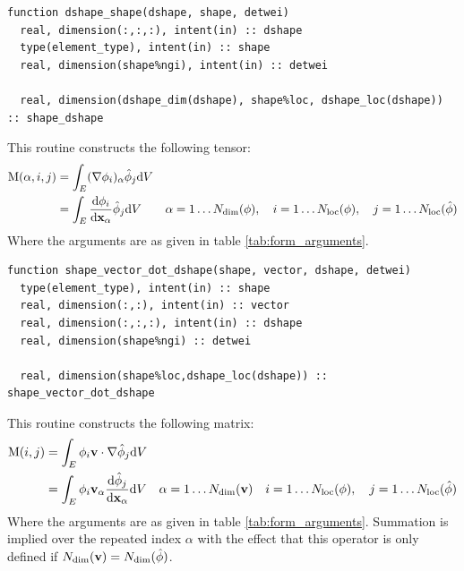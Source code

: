 \documentclass[a4paper, 11pt]{book}
\begin{document}

\begin{lstlisting}
function dshape_shape(dshape, shape, detwei)
  real, dimension(:,:,:), intent(in) :: dshape
  type(element_type), intent(in) :: shape
  real, dimension(shape%ngi), intent(in) :: detwei

  real, dimension(dshape_dim(dshape), shape%loc, dshape_loc(dshape)) :: shape_dshape
\end{lstlisting}
This routine constructs the following tensor:
\begin{equation}
  \begin{split}
    \mathrm{M}(\alpha,i,j)&=\int_E (\nabla{\phi}_i)_\alpha\hat{\phi}_{j}\mathrm{d} V\\
    &=\int_E \frac{\mathrm{d}\phi_i}{\mathrm{d}\mathbf{x}_\alpha}\hat{\phi}_{j}\mathrm{d} V\quad
  \quad \alpha=1\ldots N_\mathrm{dim}(\phi),\quad i=1\ldots N_\mathrm{loc}(\phi),\quad j=1\ldots N_\mathrm{loc}(\hat{\phi})
  \end{split}
\end{equation}
Where the arguments are as given in table \ref{tab:form_arguments}.



\begin{lstlisting}
function shape_vector_dot_dshape(shape, vector, dshape, detwei)
  type(element_type), intent(in) :: shape
  real, dimension(:,:), intent(in) :: vector
  real, dimension(:,:,:), intent(in) :: dshape
  real, dimension(shape%ngi) :: detwei

  real, dimension(shape%loc,dshape_loc(dshape)) :: shape_vector_dot_dshape
\end{lstlisting}

This routine constructs the following matrix:
\begin{equation}
\begin{split} 
  \mathrm{M}(i,j)&=\int_E \phi_{i}\mathbf{v}\cdot\nabla\hat{\phi}_{j}\mathrm{d} V\\
  &=\int_E \phi_{i}\mathbf{v}_\alpha\frac{\mathrm{d}\hat\phi_{j}}{\mathrm{d}\mathbf{x}_\alpha}\mathrm{d} V
  \quad\alpha=1\ldots N_\mathrm{dim}(\mathbf{v})\quad i=1\ldots N_\mathrm{loc}(\phi),\quad
  j=1\ldots N_\mathrm{loc}(\hat{\phi})
\end{split}
\end{equation}
Where the arguments are as given in table
\ref{tab:form_arguments}. Summation is implied over the repeated index
$\alpha$ with the effect that this operator is only defined if $N_\mathrm{dim}(\mathbf{v})=N_\mathrm{dim}(\hat\phi)$.


\end{document}
